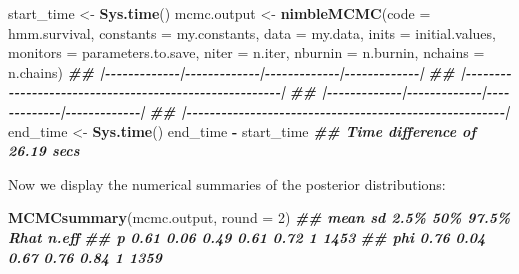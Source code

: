 \documentclass[
  12pt,
]{krantz}
\newenvironment{Shaded}{\begin{snugshade}}{\end{snugshade}}
\newcommand{\AttributeTok}[1]{\textcolor[rgb]{0.13,0.29,0.53}{#1}}
\newcommand{\DecValTok}[1]{\textcolor[rgb]{0.00,0.00,0.81}{#1}}
\newcommand{\DocumentationTok}[1]{\textcolor[rgb]{0.56,0.35,0.01}{\textbf{\textit{#1}}}}
\newcommand{\FunctionTok}[1]{\textcolor[rgb]{0.13,0.29,0.53}{\textbf{#1}}}
\newcommand{\NormalTok}[1]{#1}
\newcommand{\OtherTok}[1]{\textcolor[rgb]{0.56,0.35,0.01}{#1}}
\newcommand{\SpecialCharTok}[1]{\textcolor[rgb]{0.81,0.36,0.00}{\textbf{#1}}}
\begin{document}
\begin{Shaded}
\begin{Highlighting}[]
\NormalTok{start\_time }\OtherTok{\textless{}{-}} \FunctionTok{Sys.time}\NormalTok{()}
\NormalTok{mcmc.output }\OtherTok{\textless{}{-}} \FunctionTok{nimbleMCMC}\NormalTok{(}\AttributeTok{code =}\NormalTok{ hmm.survival,}
                          \AttributeTok{constants =}\NormalTok{ my.constants,}
                          \AttributeTok{data =}\NormalTok{ my.data,}
                          \AttributeTok{inits =}\NormalTok{ initial.values,}
                          \AttributeTok{monitors =}\NormalTok{ parameters.to.save,}
                          \AttributeTok{niter =}\NormalTok{ n.iter,}
                          \AttributeTok{nburnin =}\NormalTok{ n.burnin,}
                          \AttributeTok{nchains =}\NormalTok{ n.chains)}
\DocumentationTok{\#\# |{-}{-}{-}{-}{-}{-}{-}{-}{-}{-}{-}{-}{-}|{-}{-}{-}{-}{-}{-}{-}{-}{-}{-}{-}{-}{-}|{-}{-}{-}{-}{-}{-}{-}{-}{-}{-}{-}{-}{-}|{-}{-}{-}{-}{-}{-}{-}{-}{-}{-}{-}{-}{-}|}
\DocumentationTok{\#\# |{-}{-}{-}{-}{-}{-}{-}{-}{-}{-}{-}{-}{-}{-}{-}{-}{-}{-}{-}{-}{-}{-}{-}{-}{-}{-}{-}{-}{-}{-}{-}{-}{-}{-}{-}{-}{-}{-}{-}{-}{-}{-}{-}{-}{-}{-}{-}{-}{-}{-}{-}{-}{-}{-}{-}|}
\DocumentationTok{\#\# |{-}{-}{-}{-}{-}{-}{-}{-}{-}{-}{-}{-}{-}|{-}{-}{-}{-}{-}{-}{-}{-}{-}{-}{-}{-}{-}|{-}{-}{-}{-}{-}{-}{-}{-}{-}{-}{-}{-}{-}|{-}{-}{-}{-}{-}{-}{-}{-}{-}{-}{-}{-}{-}|}
\DocumentationTok{\#\# |{-}{-}{-}{-}{-}{-}{-}{-}{-}{-}{-}{-}{-}{-}{-}{-}{-}{-}{-}{-}{-}{-}{-}{-}{-}{-}{-}{-}{-}{-}{-}{-}{-}{-}{-}{-}{-}{-}{-}{-}{-}{-}{-}{-}{-}{-}{-}{-}{-}{-}{-}{-}{-}{-}{-}|}
\NormalTok{end\_time }\OtherTok{\textless{}{-}} \FunctionTok{Sys.time}\NormalTok{()}
\NormalTok{end\_time }\SpecialCharTok{{-}}\NormalTok{ start\_time}
\DocumentationTok{\#\# Time difference of 26.19 secs}
\end{Highlighting}
\end{Shaded}

Now we display the numerical summaries of the posterior distributions:

\begin{Shaded}
\begin{Highlighting}[]
\FunctionTok{MCMCsummary}\NormalTok{(mcmc.output, }\AttributeTok{round =} \DecValTok{2}\NormalTok{)}
\DocumentationTok{\#\#     mean   sd 2.5\%  50\% 97.5\% Rhat n.eff}
\DocumentationTok{\#\# p   0.61 0.06 0.49 0.61  0.72    1  1453}
\DocumentationTok{\#\# phi 0.76 0.04 0.67 0.76  0.84    1  1359}
\end{Highlighting}
\end{Shaded}
\end{document}
